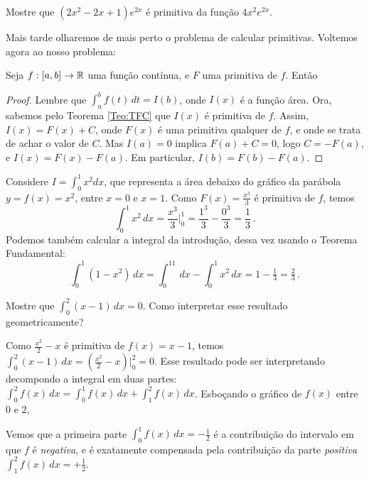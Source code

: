 \begin{exo}
Mostre que $(2x^2-2x+1)e^{2x}$ é primitiva da função $4x^2e^{2x}$.
\end{exo}


Mais tarde olharemos de mais perto o problema de calcular primitivas.
Voltemos agora ao nosso problema:
\begin{teo}\label{Teo:TFC2}
Seja $f:[a,b]\to \mathbb{R}$ uma função contínua, e $F$ uma primitiva de $f$.
Então
\end{teo}

\begin{proof} Lembre que $\int_a^bf(t)\,dt=I(b)$, onde $I(x)$ é a função
área. Ora, sabemos pelo Teorema \ref{Teo:TFC} que $I(x)$ é primitiva
de $f$. Assim, $I(x)=F(x)+C$, onde $F(x)$ é uma primitiva qualquer de $f$, e
onde se trata de achar o valor de $C$.
Mas $I(a)=0$ implica $F(a)+C=0$, logo $C=-F(a)$, e $I(x)=F(x)-F(a)$. Em
particular, $I(b)=F(b)-F(a)$.
\end{proof}

\begin{ex}
Considere $I=\int_0^1x^2dx$, que representa
a área debaixo do gráfico da parábola $y=f(x)=x^2$, entre $x=0$ e $x=1$. 
Como $F(x)=\frac{x^3}{3}$ é primitiva de $f$, temos 
$$\int_0^1x^2\,dx=\frac{x^3}{3}\Big|_{0}^1=\frac{1^3}{3}-\frac{0^3}{3}=\frac{1}{
3} \,.$$
Podemos também calcular a integral da introdução, dessa vez usando o Teorema
Fundamental:
$$\int_0^1(1-x^2)\,dx=\int_0^11\,dx-\int_0^1x^2\,dx=1-\tfrac13=\tfrac23\,.$$
\end{ex}


\begin{exo}\label{Exo:IntegraleNegative}
Mostre que $\int_0^2(x-1)\,dx=0$. Como interpretar esse resultado
geometricamente?
\begin{sol}
Como $\tfrac{x^2}{2}-x$ é primitiva de $f(x)=x-1$, temos
$\int_0^2(x-1)\,dx=(\tfrac{x^2}{2}-x)|_0^2=0$.  
Esse resultado pode ser interpretando decompondo a integral em duas partes: 
$\int_0^2f(x)\,dx=\int_0^1f(x)\,dx+\int_1^2f(x)\,dx$.
Esboçando o gráfico de $f(x)$ entre $0$ e $2$,
\begin{center}
\begin{bmlimage}\end{bmlimage}
\end{center}
Vemos que a primeira parte 
$\int_0^1f(x)\,dx=-\tfrac12$ é a contribuição do intervalo em
que $f$ é \emph{negativa}, e é exatamente
compensada pela contribuição da parte \emph{positiva}
$\int_1^2f(x)\,dx=+\tfrac12$.
\end{sol} 
\end{exo}

